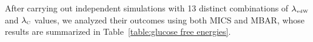 \documentclass[
    journal=jctcce,
    layout=twocolumn
]{achemso}
\begin{document}
After carrying out independent simulations with 13 distinct combinations of $\lambda_\text{\tiny vdW}$ and $\lambda_\text{\tiny C}$ values, we analyzed their outcomes using both MICS and MBAR, whose results are summarized in Table~\ref{table:glucose free energies}. %


\end{document}
